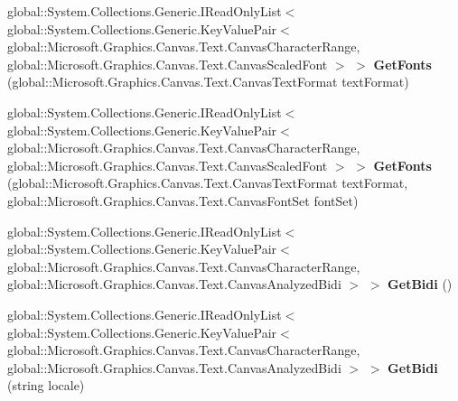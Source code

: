 \begin{DoxyCompactItemize}
global\+::\+System.\+Collections.\+Generic.\+I\+Read\+Only\+List$<$ global\+::\+System.\+Collections.\+Generic.\+Key\+Value\+Pair$<$ global\+::\+Microsoft.\+Graphics.\+Canvas.\+Text.\+Canvas\+Character\+Range, global\+::\+Microsoft.\+Graphics.\+Canvas.\+Text.\+Canvas\+Scaled\+Font $>$ $>$ {\bfseries Get\+Fonts} (global\+::\+Microsoft.\+Graphics.\+Canvas.\+Text.\+Canvas\+Text\+Format text\+Format)
\item 
\mbox{\label{class_microsoft_1_1_graphics_1_1_canvas_1_1_text_1_1_canvas_text_analyzer_a9391eb6d25fdcd24794b19ace3079abb}} 
global\+::\+System.\+Collections.\+Generic.\+I\+Read\+Only\+List$<$ global\+::\+System.\+Collections.\+Generic.\+Key\+Value\+Pair$<$ global\+::\+Microsoft.\+Graphics.\+Canvas.\+Text.\+Canvas\+Character\+Range, global\+::\+Microsoft.\+Graphics.\+Canvas.\+Text.\+Canvas\+Scaled\+Font $>$ $>$ {\bfseries Get\+Fonts} (global\+::\+Microsoft.\+Graphics.\+Canvas.\+Text.\+Canvas\+Text\+Format text\+Format, global\+::\+Microsoft.\+Graphics.\+Canvas.\+Text.\+Canvas\+Font\+Set font\+Set)
\item 
\mbox{\label{class_microsoft_1_1_graphics_1_1_canvas_1_1_text_1_1_canvas_text_analyzer_a126fa8fa30a35ccb5f02bfc0b7f3555a}} 
global\+::\+System.\+Collections.\+Generic.\+I\+Read\+Only\+List$<$ global\+::\+System.\+Collections.\+Generic.\+Key\+Value\+Pair$<$ global\+::\+Microsoft.\+Graphics.\+Canvas.\+Text.\+Canvas\+Character\+Range, global\+::\+Microsoft.\+Graphics.\+Canvas.\+Text.\+Canvas\+Analyzed\+Bidi $>$ $>$ {\bfseries Get\+Bidi} ()
\item 
\mbox{\label{class_microsoft_1_1_graphics_1_1_canvas_1_1_text_1_1_canvas_text_analyzer_a2e6d9177ebbc245e8b654995526c08c6}} 
global\+::\+System.\+Collections.\+Generic.\+I\+Read\+Only\+List$<$ global\+::\+System.\+Collections.\+Generic.\+Key\+Value\+Pair$<$ global\+::\+Microsoft.\+Graphics.\+Canvas.\+Text.\+Canvas\+Character\+Range, global\+::\+Microsoft.\+Graphics.\+Canvas.\+Text.\+Canvas\+Analyzed\+Bidi $>$ $>$ {\bfseries Get\+Bidi} (string locale)
\item 
\mbox{\label{class_microsoft_1_1_graphics_1_1_canvas_1_1_text_1_1_canvas_text_analyzer_a8c6c6adb235f7f370a7d2cd4be812e59}} 

\end{DoxyCompactItemize}
